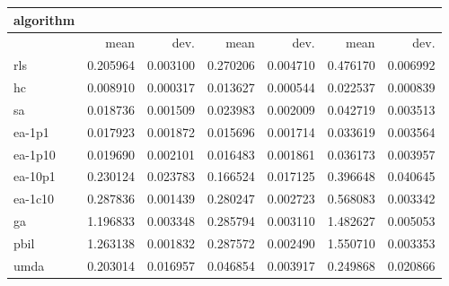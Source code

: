 \begin{tabular}{@{}l*{6}{>{{}}N{1}{2}}@{}}
\toprule
{algorithm} &  &  &  \\
\midrule
& {mean} & {dev.} & {mean} & {dev.} & {mean} & {dev.} \\
\midrule
rls & 0.205964 & 0.003100 & 0.270206 & 0.004710 & 0.476170 & 0.006992 \\
 hc & 0.008910 & 0.000317 & 0.013627 & 0.000544 & 0.022537 & 0.000839 \\
 sa & 0.018736 & 0.001509 & 0.023983 & 0.002009 & 0.042719 & 0.003513 \\
 ea-1p1 & 0.017923 & 0.001872 & 0.015696 & 0.001714 & 0.033619 & 0.003564 \\
 ea-1p10 & 0.019690 & 0.002101 & 0.016483 & 0.001861 & 0.036173 & 0.003957 \\
 ea-10p1 & 0.230124 & 0.023783 & 0.166524 & 0.017125 & 0.396648 & 0.040645 \\
 ea-1c10 & 0.287836 & 0.001439 & 0.280247 & 0.002723 & 0.568083 & 0.003342 \\
 ga & 1.196833 & 0.003348 & 0.285794 & 0.003110 & 1.482627 & 0.005053 \\
 pbil & 1.263138 & 0.001832 & 0.287572 & 0.002490 & 1.550710 & 0.003353 \\
 umda & 0.203014 & 0.016957 & 0.046854 & 0.003917 & 0.249868 & 0.020866 \\
 \bottomrule
\end{tabular}
